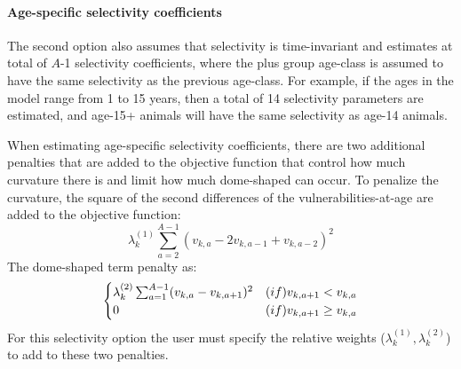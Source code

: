 \paragraph{Age-specific selectivity coefficients}
The second option also assumes that selectivity is time-invariant and estimates at total of $A$-1 selectivity coefficients, where the plus group age-class is assumed to have the same selectivity as the previous age-class.  For example, if the ages in the model range from 1 to 15 years, then a total of 14 selectivity parameters are estimated, and age-15+ animals will have the same selectivity as age-14 animals.

When estimating age-specific selectivity coefficients, there are two additional penalties that are added to the objective function that control how much curvature there is and limit how much dome-shaped can occur.  To penalize the curvature, the square of the second differences of the vulnerabilities-at-age are added to the objective function: 
\begin{equation}\label{eq2ndDiff}
\lambda_k^{(1)} \sum_{a=2}^{A-1}(v_{k,a} - 2v_{k,a-1} + v_{k,a-2})^2
\end{equation}
The dome-shaped term penalty as:
\begin{equation}\label{eqDomePenalty}
\begin{cases}
\lambda_k^{(2)} \sum_{a=1}^{A-1}(v_{k,a} - v_{k,a+1})^2& \mbox(if) v_{k,a+1}< v_{k,a}\\
0 & \mbox(if) v_{k,a+1}\geq v_{k,a}
\end{cases}
\end{equation}
For this selectivity option the user must specify the relative weights ($\lambda_k^{(1)},\lambda_k^{(2)}$) to add to these two penalties.


